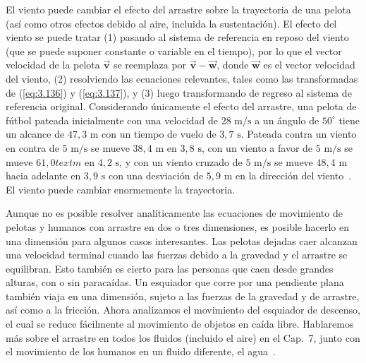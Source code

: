 \documentclass[12pt]{book}
\begin{document}
El viento puede cambiar el efecto del arrastre sobre la trayectoria de una pelota (así como otros efectos debido al aire, incluida la sustentación). El efecto del viento se puede tratar (1) pasando al sistema de referencia en reposo del viento (que se puede suponer constante o variable en el tiempo), por lo que el vector velocidad de la pelota $\vec{\mathbf{v}}$ se reemplaza por $\vec{\mathbf{v}} - \vec{\mathbf{w}}$, donde $\vec{\mathbf{w}}$ es el vector velocidad del viento, (2) resolviendo las ecuaciones relevantes, tales como las transformadas de (\ref{eq:3.136}) y (\ref{eq:3.137}), y (3) luego transformando de regreso al sistema de referencia original. Considerando únicamente el efecto del arrastre, una pelota de fútbol pateada inicialmente con una velocidad de $28\text{ m/s}$ a un ángulo de $50^\circ$ tiene un alcance de $47{,}3\text{ m}$ con un tiempo de vuelo de $3{,}7\text{ s}$. Pateada contra un viento en contra de $5\text{ m/s}$ se mueve $38{,}4\text{ m}$ en $3{,}8\text{ s}$, con un viento a favor de $5\text{ m/s}$ se mueve $61{,}0text{ m}$ en $4{,}2\text{ s}$, y con un viento cruzado de $5\text{ m/s}$ se mueve $48{,}4\text{ m}$ hacia adelante en $3{,}9\text{ s}$ con una desviación de $5{,}9\text{ m}$ en la dirección del viento~\cite{ref37}. El viento puede cambiar enormemente la trayectoria.

Aunque no es posible resolver analíticamente las ecuaciones de movimiento de pelotas y humanos con arrastre en dos o tres dimensiones, es posible hacerlo en una dimensión para algunos casos interesantes. Las pelotas dejadas caer alcanzan una velocidad terminal cuando las fuerzas debido a la gravedad y el arrastre se equilibran. Esto también es cierto para las personas que caen desde grandes alturas, con o sin paracaídas. Un esquiador que corre por una pendiente plana también viaja en una dimensión, sujeto a las fuerzas de la gravedad y de arrastre, así como a la fricción. Ahora analizamos el movimiento del esquiador de descenso, el cual se reduce fácilmente al movimiento de objetos en caída libre. Hablaremos más sobre el arrastre en todos los fluidos (incluido el aire) en el Cap.~7, junto con el movimiento de los humanos en un fluido diferente, el agua~\cite{ref135}.
\end{document}
